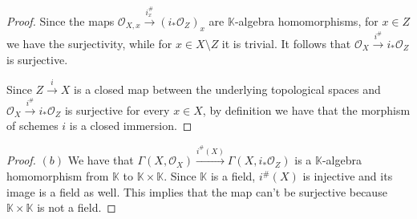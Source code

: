 \documentclass{article}
\newcommand{\numberset}{\mathbb}
\newcommand{\K}{\numberset{K}}
\begin{document}
\begin{proof}
    Since the maps $\mathcal{O}_{X,x}\xrightarrow{i^\#_x}(i_*\mathcal{O}_{Z})_x$
    are $\K$-algebra homomorphisms, for $x\in Z$ we have the surjectivity, while
    for $x\in X\setminus Z$ it is trivial. It follows that
    $\mathcal{O}_X\xrightarrow{i^\#}i_*\mathcal{O}_Z$ is surjective.

    Since $Z\xrightarrow{i}X$ is a closed map between the underlying topological
    spaces and $\mathcal{O}_X\xrightarrow{i^\#}i_*\mathcal{O}_Z$ is
    surjective for every $x\in X$, by definition we have that the morphism of
    schemes $i$ is a closed immersion.
\end{proof}

\begin{proof}
    $(b)$ We have that
    $\Gamma(X,\mathcal{O}_X)\xrightarrow{i^\#(X)}\Gamma(X,i_*\mathcal{O}_Z)$ is
    a $\K$-algebra homomorphism from $\K$ to $\K\times\K$. Since $\K$ is a
    field, $i^\#(X)$ is injective and its image is a field as well. This implies
    that the map can't be surjective because $\K\times\K$ is not a field.
\end{proof}
\end{document}
